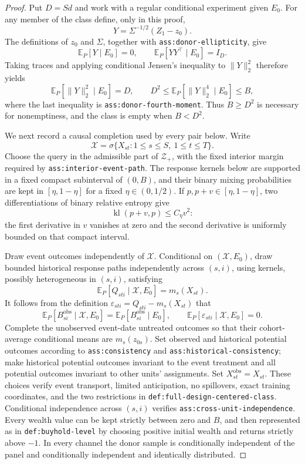 \documentclass{article}
\begin{document}
\begin{proof}
Put \(D=Sd\) and work with a regular conditional experiment given \(E_0\).  For any member of the class define, only in this proof,
\[
Y=\Sigma^{-1/2}(Z_1-z_0).
\]
The definitions of \(z_0\) and \(\Sigma\), together with \texttt{ass:donor-ellipticity}, give
\[
\mathbb E_P[Y\mid E_0]=0,
\qquad
\mathbb E_P[YY^\top\mid E_0]=I_D.
\]
Taking traces and applying conditional Jensen's inequality to \(\|Y\|_2^2\) therefore yields
\[
\mathbb E_P[\|Y\|_2^2\mid E_0]=D,
\qquad
D^2\leq \mathbb E_P[\|Y\|_2^4\mid E_0]\leq B,
\tag{1}
\]
where the last inequality is \texttt{ass:donor-fourth-moment}.  Thus \(B\geq D^2\) is necessary for nonemptiness, and the class is empty when \(B<D^2\).

We next record a causal completion used by every pair below.  Write
\[
\mathscr X=\sigma\{X_{st}:1\leq s\leq S,\ 1\leq t\leq T\}.
\]
Choose the query in the admissible part of \(\mathcal Z_+\), with the fixed interior margin required by \texttt{ass:interior-event-path}.  The response kernels below are supported in a fixed compact subinterval of \((0,B)\), and their binary mixing probabilities are kept in \([\eta,1-\eta]\) for a fixed \(\eta\in(0,1/2)\).  If \(p,p+v\in[\eta,1-\eta]\), two differentiations of binary relative entropy give
\[
\operatorname{kl}(p+v,p)\leq C_\eta v^2:
\tag{2}
\]
the first derivative in \(v\) vanishes at zero and the second derivative is uniformly bounded on that compact interval.

Draw event outcomes independently of \(\mathscr X\).  Conditional on \((\mathscr X,E_0)\), draw bounded historical response paths independently across \((s,i)\), using kernels, possibly heterogeneous in \((s,i)\), satisfying
\[
\mathbb E_P[Q_{sti}\mid\mathscr X,E_0]=m_s(X_{st}).
\]
It follows from the definition \(\varepsilon_{sti}=Q_{sti}-m_s(X_{st})\) that
\[
\mathbb E_P[B_{si}^{\mathrm{obs}}\mid\mathscr X,E_0]
=\mathbb E_P[B_{si}^{\mathrm{obs}}\mid E_0],
\qquad
\mathbb E_P[\varepsilon_{sti}\mid\mathscr X,E_0]=0.
\tag{3}
\]
Complete the unobserved event-date untreated outcomes so that their cohort-average conditional means are \(m_s(z_{0s})\).  Set observed and historical potential outcomes according to \texttt{ass:consistency} and \texttt{ass:historical-consistency}; make historical potential outcomes invariant to the event treatment and all potential outcomes invariant to other units' assignments.  Set \(X_{st}^{\mathrm{obs}}=X_{st}\).  These choices verify event transport, limited anticipation, no spillovers, exact training coordinates, and the two restrictions in \texttt{def:full-design-centered-class}.  Conditional independence across \((s,i)\) verifies \texttt{ass:cross-unit-independence}.  Every wealth value can be kept strictly between zero and \(B\), and then represented as in \texttt{def:buyhold-level} by choosing positive initial wealth and returns strictly above \(-1\).  In every channel the donor sample is conditionally independent of the panel and conditionally independent and identically distributed.


\end{proof}
\end{document}
